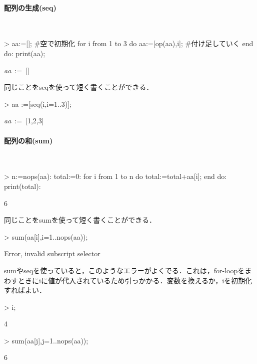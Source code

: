 \paragraph{配列の生成(seq)}　
\begin{MapleInput}
> aa:=[]; #空で初期化 
  for i from 1 to 3 do 
    aa:=[op(aa),i]; #付け足していく
  end do:
  print(aa);
\end{MapleInput}
\begin{MapleOutputGather}
{\it aa}\, := \,[] \notag \\
[1, 2, 3] \notag
\end{MapleOutputGather}
同じことをseqを使って短く書くことができる．
\begin{MapleInput}
> aa :=[seq(i,i=1..3)];
\end{MapleInput}
\begin{MapleOutput}
{\it aa}\, := \,[1,2,3]
\end{MapleOutput}

\paragraph{配列の和(sum)}　
\begin{MapleInput}
> n:=nops(aa): 
  total:=0: 
  for i from 1 to n do 
    total:=total+aa[i]; 
  end do:
  print(total):
\end{MapleInput}
\begin{MapleOutput}
6
\end{MapleOutput}

同じことをsumを使って短く書くことができる．
\begin{MapleInput}
> sum(aa[i],i=1..nops(aa));
\end{MapleInput}
\begin{MapleError}
Error, invalid subscript selector
\end{MapleError}

sumやseqを使っていると，このようなエラーがよくでる．これは，for-loopをまわすときにiに値が代入されているため引っかかる．変数を換えるか，iを初期化すればよい．
\begin{MapleInput}
> i;
\end{MapleInput}
\begin{MapleOutput}
4
\end{MapleOutput}

                                      
\begin{MapleInput}
> sum(aa[j],j=1..nops(aa));
\end{MapleInput}
\begin{MapleOutput}
6
\end{MapleOutput}

